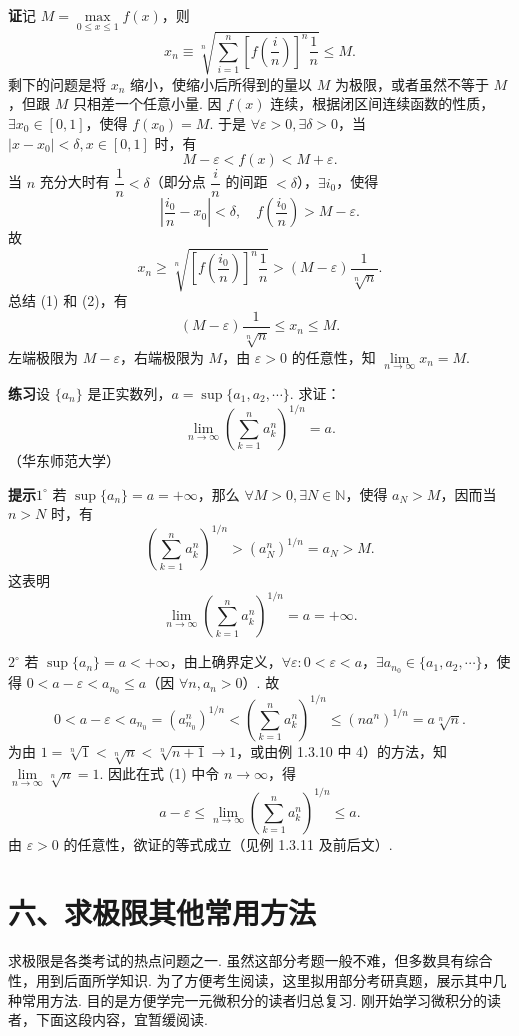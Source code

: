 \documentclass[UTF8, 12pt, fontset=fandol, oneside]{ctexart}
\begin{document}
\noindent\textbf{证}\quad 记 $M=\max\limits_{0\le x\le1}f(x)$，则
\[
  x_n\equiv\sqrt[n]{\sum_{i=1}^n\left[f\left(\frac in\right)\right]^n\frac1n}\le M.
\tag{1}
\]
剩下的问题是将 $x_n$ 缩小，使缩小后所得到的量以 $M$ 为极限，或者虽然不等于 $M$，但跟 $M$ 只相差一个任意小量. 因 $f(x)$ 连续，根据闭区间连续函数的性质，$\exists x_0\in[0,1]$，使得 $f(x_0)=M$. 于是 $\forall\varepsilon>0,\exists\delta>0$，当 $|x-x_0|<\delta,x\in[0,1]$ 时，有
\[
  M-\varepsilon<f(x)<M+\varepsilon.
\]
当 $n$ 充分大时有 $\dfrac1n<\delta$（即分点 $\dfrac in$ 的间距 $<\delta$），$\exists i_0$，使得
\[
  \left|\frac{i_0}{n}-x_0\right|<\delta,\quad
  f\left(\frac{i_0}{n}\right)>M-\varepsilon.
\]
故
\[
x_n\ge
\sqrt[n]{\left[f\left(\frac{i_0}{n}\right)\right]^n\frac1n}
>(M-\varepsilon)\frac1{\sqrt[n]{n}}.
\tag{2}
\]
总结 (1) 和 (2)，有
\[
  (M-\varepsilon)\frac1{\sqrt[n]{n}}\le x_n\le M.
\]
左端极限为 $M-\varepsilon$，右端极限为 $M$，由 $\varepsilon>0$ 的任意性，知 $\lim\limits_{n\to\infty}x_n=M$.

\noindent\textbf{练习}\quad 设 $\{a_n\}$ 是正实数列，$a=\sup\{a_1,a_2,\cdots\}$. 求证：
\[
  \lim_{n\to\infty}\left(\sum_{k=1}^n a_k^n\right)^{1/n}=a.
\]
（华东师范大学）

\noindent\textbf{提示}\quad $1^\circ$ 若 $\sup\{a_n\}=a=+\infty$，那么 $\forall M>0,\exists N\in\mathbb{N}$，使得 $a_N>M$，因而当 $n>N$ 时，有
\[
  \left(\sum_{k=1}^n a_k^n\right)^{1/n}>(a_N^n)^{1/n}=a_N>M.
\]
这表明
\[
  \lim_{n\to\infty}\left(\sum_{k=1}^n a_k^n\right)^{1/n}=a=+\infty.
\]

$2^\circ$ 若 $\sup\{a_n\}=a<+\infty$，由上确界定义，$\forall\varepsilon:0<\varepsilon<a$，$\exists a_{n_0}\in\{a_1,a_2,\cdots\}$，使得 $0<a-\varepsilon<a_{n_0}\le a$（因 $\forall n,a_n>0$）. 故
\[
0<a-\varepsilon<a_{n_0}=(a_{n_0}^n)^{1/n}
<\left(\sum_{k=1}^n a_k^n\right)^{1/n}
\le(na^n)^{1/n}=a\sqrt[n]{n}.
\tag{1}
\]
为由 $1=\sqrt[n]{1}<\sqrt[n]{n}<\sqrt[n]{n+1}\to1$，或由例 1.3.10 中 4）的方法，知 $\lim\limits_{n\to\infty}\sqrt[n]{n}=1$. 因此在式 (1) 中令 $n\to\infty$，得
\[
  a-\varepsilon\le\lim_{n\to\infty}\left(\sum_{k=1}^n a_k^n\right)^{1/n}\le a.
\]
由 $\varepsilon>0$ 的任意性，欲证的等式成立（见例 1.3.11 及前后文）.

\section*{六、求极限其他常用方法}

求极限是各类考试的热点问题之一. 虽然这部分考题一般不难，但多数具有综合性，用到后面所学知识. 为了方便考生阅读，这里拟用部分考研真题，展示其中几种常用方法. 目的是方便学完一元微积分的读者归总复习. 刚开始学习微积分的读者，下面这段内容，宜暂缓阅读.
\end{document}
